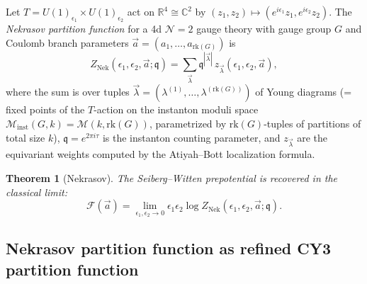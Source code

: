 \documentclass[11pt]{article}
\newtheorem{theorem}{Theorem}[section]
\theoremstyle{definition}
\theoremstyle{remark}
\newcommand{\cF}{\mathcal{F}}
\newcommand{\cM}{\mathcal{M}}
\newcommand{\cN}{\mathcal{N}}
\newcommand{\Nek}{\mathrm{Nek}}
\begin{document}
Let $T = U(1)_{\epsilon_1} \times U(1)_{\epsilon_2}$ act on $\mathbb{R}^4 \cong \mathbb{C}^2$
by $(z_1, z_2) \mapsto (e^{i\epsilon_1} z_1, e^{i\epsilon_2} z_2)$. The \emph{Nekrasov partition
function} for a 4d $\cN=2$ gauge theory with gauge group $G$ and Coulomb branch parameters
$\vec{a} = (a_1, \ldots, a_{\mathrm{rk}(G)})$ is
\begin{equation}
 \label{eq:nekrasov-pf}
 Z_{\Nek}(\epsilon_1, \epsilon_2, \vec{a}; \mathfrak{q}) = \sum_{\vec{\lambda}} \mathfrak{q}^{|\vec{\lambda}|} \, z_{\vec{\lambda}}(\epsilon_1, \epsilon_2, \vec{a}),
\end{equation}
where the sum is over tuples $\vec{\lambda} = (\lambda^{(1)}, \ldots, \lambda^{(\mathrm{rk}(G))})$
of Young diagrams (= fixed points of the $T$-action on the instanton moduli space
$\cM_{\mathrm{inst}}(G, k) = \cM(k, \mathrm{rk}(G))$, parametrized by $\mathrm{rk}(G)$-tuples
of partitions of total size $k$), $\mathfrak{q} = e^{2\pi i \tau}$ is the instanton counting
parameter, and $z_{\vec{\lambda}}$ are the equivariant weights computed by the Atiyah--Bott
localization formula.

\begin{theorem}[Nekrasov]
 \label{thm:nekrasov}
 The Seiberg--Witten prepotential is recovered in the classical limit:
 \begin{equation}
 \label{eq:nekrasov-limit}
 \cF(\vec{a}) = \lim_{\epsilon_1, \epsilon_2 \to 0} \epsilon_1 \epsilon_2 \log Z_{\Nek}(\epsilon_1, \epsilon_2, \vec{a}; \mathfrak{q}).
 \end{equation}
\end{theorem}

\subsection{Nekrasov partition function as refined CY3 partition function}
\label{subsec:nekrasov-cy3}
\end{document}
